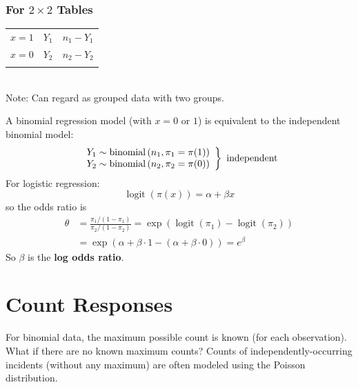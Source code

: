 \documentclass[11pt]{elegantbook}
\begin{document}
\subsubsection*{For $2\times 2$ Tables}
\begin{table}[htbp]
    \centering
    \begin{tabular}{rllll}
        \cline{2-5}
        \multicolumn{1}{r|}{$x=1$}&\multicolumn{2}{l|}{$Y_1$}&\multicolumn{2}{l|}{$n_1-Y_1$}\\
        \cline{2-5}
        \multicolumn{1}{r|}{$x=0$}&\multicolumn{2}{l|}{$Y_2$}&\multicolumn{2}{l|}{$n_2-Y_2$}\\
        \cline{2-5}
        \multicolumn{1}{l}{}&&&&
    \end{tabular}\\
    Note: Can regard as grouped data with two groups.
\end{table}
A binomial regression model (with $x=0$ or $1$) is equivalent to the independent binomial model:
$$
\left.\begin{array}{l}
Y_1 \sim \operatorname{binomial}\left(n_1, \pi_1=\pi(1)\right) \\
Y_2 \sim \operatorname{binomial}\left(n_2, \pi_2=\pi(0)\right)
\end{array}\right\} \textnormal{ independent}
$$
For logistic regression:
$$
\operatorname{logit}(\pi(x))=\alpha+\beta x
$$
so the odds ratio is
$$
\begin{aligned}
\theta & =\frac{\pi_1 /\left(1-\pi_1\right)}{\pi_2 /\left(1-\pi_2\right)}=\exp \left(\operatorname{logit}\left(\pi_1\right)-\operatorname{logit}\left(\pi_2\right)\right) \\
& =\exp (\alpha+\beta \cdot 1-(\alpha+\beta \cdot 0))=e^\beta
\end{aligned}
$$
So $\beta$ is the \textbf{log odds ratio}.




\section{Count Responses}
For binomial data, the maximum possible count is known (for each observation). What if there are no known maximum counts? Counts of independently-occurring incidents (without any maximum) are often modeled using the Poisson distribution.
\end{document}
